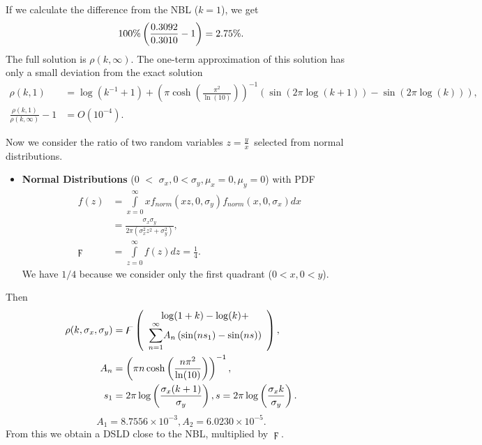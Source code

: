 \documentclass[titlepage,fleqn]{article}%
\begin{document}
If we calculate the difference from the NBL ($k=1$), we get%
\[
100\%\left(  \frac{0{\small .3092}}{0.3010}-1\right)  =2.75\%.
\]
The full solution is $\rho(k,\infty).$ The one-term approximation of this
solution has only a small deviation from the exact solution
\begin{align*}
\rho(k,1)  &  =\log(k^{-1}+1)+\left(  \pi\cosh\left(  \frac{\pi^{2}}{\ln
(10)}\right)  \right)  ^{-1}\left(  \sin(2\pi\log(k+1))-\sin(2\pi
\log(k))\right)  ,\\
\frac{\rho(k,1)}{\rho(k,\infty)}-1  &  =O\left(  10^{-4}\right)  .
\end{align*}


Now we consider the ratio of two random variables $z=\frac{y}{x}$\ selected
from normal distributions.

\begin{itemize}
\item \textbf{Normal Distributions} ($0$%
$<$%
$\sigma_{x},0<\sigma_{y},\mu_{x}=0,\mu_{y}=0$) with PDF%
\begin{align*}
f(z)  &  =%
{\displaystyle\int\limits_{x=0}^{\infty}}
xf_{norm}(xz,0,\sigma_{y})f_{norm}(x,0,\sigma_{x})dx\\
&  =\frac{\sigma_{x}\sigma_{y}}{2\pi\left(  \sigma_{x}^{2}z^{2}+\sigma_{y}%
^{2}\right)  },\\
\digamma &  =%
{\displaystyle\int\limits_{z=0}^{\infty}}
f(z)dz=\frac{1}{4}.
\end{align*}
We have $1/4$ because we consider only the first quadrant ($0<x,0<y$).
\end{itemize}

Then%
\begin{align*}
\rho(k,\sigma_{x},\sigma_{y})  &  =\digamma\left(
\begin{array}
[c]{c}%
\log(1+k)-\log(k)+\\%
{\displaystyle\sum\limits_{n=1}^{\infty}}
A_{n}\left(  \sin(ns_{1}\right)  -\sin(ns))
\end{array}
\right)  ,\\
A_{n}  &  =\left(  \pi n\cosh\left(  \frac{n\pi^{2}}{\ln(10)}\right)  \right)
^{-1},\\
s_{1}  &  =2\pi\log\left(  \frac{\sigma_{x}(k+1)}{\sigma_{y}}\right)
,s=2\pi\log\left(  \frac{\sigma_{x}k}{\sigma_{y}}\right)  .
\end{align*}%
\[
A_{1}=8.7556\times10^{-3},A_{2}=6.0230\times10^{-5}.
\]
From this we obtain a DSLD close to the NBL, multiplied by $\digamma$.
\end{document}
